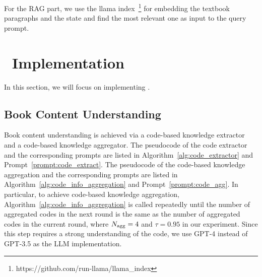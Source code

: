 For the RAG part, we use the llama index~\citep{Liu_LlamaIndex_2022}\footnote{https://github.com/run-llama/llama\_index} for embedding the textbook paragraphs and the state and find the most relevant one as input to the query prompt.


\section{\algo~Implementation}
\label{app:uri}

In this section, we will focus on implementing \algo. 

\subsection{Book Content Understanding}
\label{app:understand}

Book content understanding is achieved via a code-based knowledge extractor and a code-based knowledge aggregator. The pseudocode of the code extractor and the corresponding prompts are listed in Algorithm~\ref{alg:code_extractor} and Prompt~\ref{prompt:code_extract}. 
The pseudocode of the code-based knowledge aggregation and the corresponding prompts are listed in Algorithm~\ref{alg:code_info_aggregation} and Prompt~\ref{prompt:code_agg}. In particular, to achieve code-based knowledge aggregation, Algorithm~\ref{alg:code_info_aggregation} is called repeatedly until the number of aggregated codes in the next round is the same as the number of aggregated codes in the current round, where $N_{\rm agg}=4$ and $\tau=0.95$ in our experiment. Since this step requires a strong understanding of the code, we use GPT-4 instead of GPT-3.5 as the LLM implementation.

